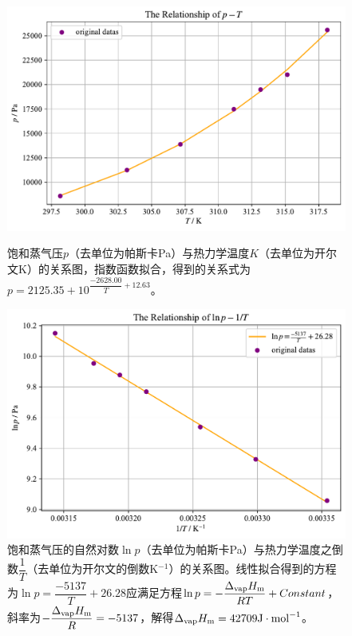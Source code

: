 \documentclass[UTF8,AutoFakeBold,a4paper]{article}
\begin{document}
	\begin{figure}[h]
	\centering
	\includegraphics[scale=0.6]{饱和蒸气压1}
	\caption{饱和蒸气压$p$（去单位为帕斯卡Pa）与热力学温度$K$（去单位为开尔文K）的关系图，指数函数拟合，得到的关系式为\textcolor[rgb]{0.54,0.13,0.33}{$p = 2125.35 + 10^{\dfrac{-2628.00}{T} +  \displaystyle 12.63}$}。}
	\label{fi3}
	\centering
	\includegraphics[scale=0.6]{饱和蒸气压2}
	\caption{饱和蒸气压的自然对数$\ln{p}$（去单位为帕斯卡Pa）与热力学温度之倒数$\dfrac{1}{T}$（去单位为开尔文的倒数K$^{-1}$）的关系图。线性拟合得到的方程为\textcolor[rgb]{0.54,0.13,0.33}{$\ln{p} = \dfrac{-5137}{T}+ 26.28$}应满足方程\textcolor[rgb]{0.07,0.36,0.57}{$\ln{p} = -\dfrac{\Delta_{\rm{vap}}H_{\rm{m}}}{RT} + Constant$}，斜率为\textcolor[rgb]{0.07,0.36,0.57}{$-\dfrac{\Delta_{\rm{vap}}H_{\rm{m}}}{R} = -5137$}，解得\textcolor[rgb]{0.54,0.13,0.33}{$\Delta_{\rm{vap}}H_{\rm{m}} = 42709\rm{J}\cdot\rm{mol}^{-1}$}。}
	\label{fi4}
\end{figure}
\end{document}
